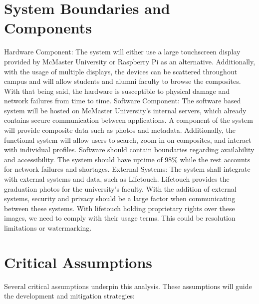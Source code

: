 \documentclass{article}
\begin{document}
\section{System Boundaries and Components}
Hardware Component: The system will either use a large touchscreen display provided by
McMaster University or Raspberry Pi as an alternative. Additionally, with the usage of multiple
displays, the devices can be scattered throughout campus and will allow students and alumni
faculty to browse the composites. With that being said, the hardware is susceptible to physical
damage and network failures from time to time.
\newline
\newline
Software Component: The software based system will be hosted on McMaster University’s
internal servers, which already contains secure communication between applications. A
component of the system will provide composite data such as photos and metadata. Additionally,
the functional system will allow users to search, zoom in on composites, and interact with
individual profiles. Software should contain boundaries regarding availability and accessibility. The
system should have uptime of 98\% while the rest accounts for network failures and shortages.
\newline
\newline
External Systems: The system shall integrate with external systems and data, such as Lifetouch.
Lifetouch provides the graduation photos for the university’s faculty. With the addition of external
systems, security and privacy should be a large factor when communicating between these
systems. With lifetouch holding proprietary rights over these images, we need to comply with
their usage terms. This could be resolution limitations or watermarking.

\section{Critical Assumptions}

Several critical assumptions underpin this analysis. These assumptions will guide the development and mitigation strategies:
\end{document}
